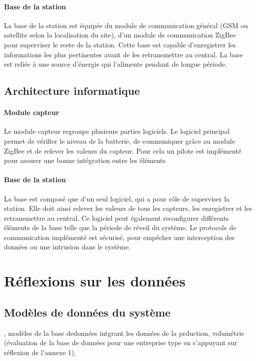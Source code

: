 \paragraph{Base de la station} La base de la station est équipée du module de communication général  (GSM ou satellite selon la localisation du site), d’un module de communication ZigBee pour superviser le reste de la station. Cette base est capable d’enregistrer les informations les plus pertinentes avant de les retransmettre au central. La base est reliée à une source d’énergie qui l’alimente pendant de longue période. 

\subsection{Architecture informatique}

\paragraph{Module capteur} Le module capteur regroupe plusieurs parties logiciels. Le logiciel principal permet de vérifier le niveau de la batterie, de communiquer grâce au module ZigBee et de relever les valeurs du capteur. Pour cela un pilote est implémenté pour assurer une bonne intégration entre les éléments
\paragraph{Base de la station} La base est composé que d’un seul logiciel, qui a pour rôle de superviser la station. Elle doit ainsi relever les valeurs de tous les capteurs, les enregistrer et les retransmettre au central. Ce logiciel peut également reconfigurer différents éléments de la base telle que la période de réveil du système. Le protocole de communication implémenté est sécurisé, pour empêcher une interception des données ou une intrusion dans le système.

\section{Réflexions sur les données}

\subsection{Modèles de données du système}

, modèles de la base dedonnées intgrant les données de la prduction, volumétrie (évaluation de la base de données
pour une entreprise type en s’appuyant sur réflexion de l’annexe 1),

